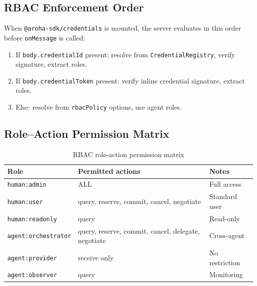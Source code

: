 \documentclass[11pt,a4paper]{article}
\begin{document}
\subsection{RBAC Enforcement Order}

When \texttt{@aroha-sdk/credentials} is mounted, the server evaluates in this order
before \texttt{onMessage} is called:

\begin{enumerate}[noitemsep]
  \item If \texttt{body.credentialId} present: resolve from \texttt{CredentialRegistry},
        verify signature, extract roles.
  \item If \texttt{body.credentialToken} present: verify inline credential signature,
        extract roles.
  \item Else: resolve from \texttt{rbacPolicy} options, use agent roles.
\end{enumerate}

\subsection{Role--Action Permission Matrix}

\begin{table}[ht]
  \centering
  \renewcommand{\arraystretch}{1.3}
  \begin{tabularx}{\textwidth}{@{} l X l @{}}
    \toprule
    \textbf{Role} & \textbf{Permitted actions} & \textbf{Notes} \\
    \midrule
    \texttt{human:admin}        & ALL                                            & Full access \\
    \texttt{human:user}         & query, reserve, commit, cancel, negotiate      & Standard user \\
    \texttt{human:readonly}     & query                                          & Read-only \\
    \texttt{agent:orchestrator} & query, reserve, commit, cancel, delegate, negotiate & Cross-agent \\
    \texttt{agent:provider}     & receive only                                   & No restriction \\
    \texttt{agent:observer}     & query                                          & Monitoring \\
    \bottomrule
  \end{tabularx}
  \caption{RBAC role-action permission matrix}
\end{table}
\end{document}
